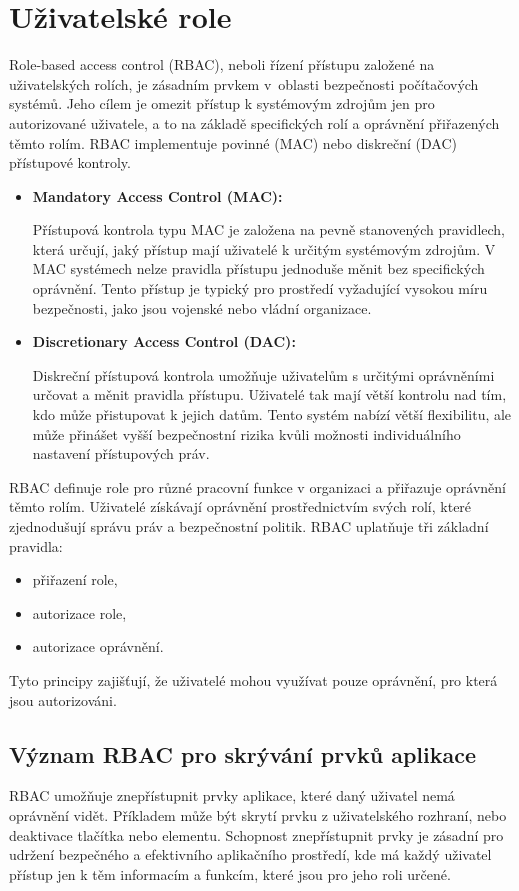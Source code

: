 \section{Uživatelské role}
 
Role-based access control (RBAC), neboli řízení přístupu založené na uživatelských rolích, je zásadním prvkem v~oblasti bezpečnosti počítačových systémů. Jeho cílem je omezit přístup k systémovým zdrojům jen pro autorizované uživatele, a to na základě specifických rolí a oprávnění přiřazených těmto rolím. RBAC implementuje povinné (MAC) nebo diskreční (DAC) přístupové kontroly.

\begin{itemize}
  \item \textbf{Mandatory Access Control (MAC):}
  
  Přístupová kontrola typu MAC je založena na pevně stanovených pravidlech, která určují, jaký přístup mají uživatelé k určitým systémovým zdrojům. V MAC systémech nelze pravidla přístupu jednoduše měnit bez specifických oprávnění. Tento přístup je typický pro prostředí vyžadující vysokou míru bezpečnosti, jako jsou vojenské nebo vládní organizace.

  \item \textbf{Discretionary Access Control (DAC):}
  
  Diskreční přístupová kontrola umožňuje uživatelům s určitými oprávněními určovat a měnit pravidla přístupu. Uživatelé tak mají větší kontrolu nad tím, kdo může přistupovat k jejich datům. Tento systém nabízí větší flexibilitu, ale může přinášet vyšší bezpečnostní rizika kvůli možnosti individuálního nastavení přístupových práv.
\end{itemize}

RBAC definuje role pro různé pracovní funkce v organizaci a přiřazuje oprávnění těmto rolím. Uživatelé získávají oprávnění prostřednictvím svých rolí, které zjednodušují správu práv a bezpečnostní politik. RBAC uplatňuje tři základní pravidla: 
\begin{itemize}
    \item přiřazení role,
    \item autorizace role,
    \item autorizace oprávnění.
\end{itemize}
Tyto principy zajišťují, že uživatelé mohou využívat pouze oprávnění, pro která jsou autorizováni.

\subsection{Význam RBAC pro skrývání prvků aplikace}
RBAC umožňuje znepřístupnit prvky aplikace, které daný uživatel nemá oprávnění vidět. Příkladem může být skrytí prvku z uživatelského rozhraní, nebo deaktivace tlačítka nebo elementu. Schopnost znepřístupnit prvky je zásadní pro udržení bezpečného a efektivního aplikačního prostředí, kde má každý uživatel přístup jen k těm informacím a funkcím, které jsou pro jeho roli určené.


